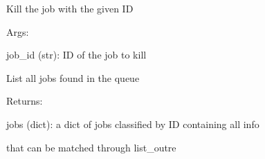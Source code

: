 \documentclass[letterpaper,10pt,english]{sphinxmanual}
\begin{document}
\begin{fulllineitems}
\begin{fulllineitems}
\label{doctree/soprano.hpc.submitter.queues:soprano.hpc.submitter.queues.QueueInterface.PBS}
\end{fulllineitems}


\begin{fulllineitems}
\label{doctree/soprano.hpc.submitter.queues:soprano.hpc.submitter.queues.QueueInterface.kill}
Kill the job with the given ID

\begin{DUlineblock}{0em}
\item[] Args:
\item[]
\begin{DUlineblock}{\DUlineblockindent}
\item[] job\_id (str): ID of the job to kill
\item[] 
\end{DUlineblock}
\end{DUlineblock}

\end{fulllineitems}


\begin{fulllineitems}
\label{doctree/soprano.hpc.submitter.queues:soprano.hpc.submitter.queues.QueueInterface.list}
List all jobs found in the queue

\begin{DUlineblock}{0em}
\item[] Returns:
\item[]
\begin{DUlineblock}{\DUlineblockindent}
\item[] jobs (dict): a dict of jobs classified by ID containing all info
\item[]
\begin{DUlineblock}{\DUlineblockindent}
\item[] that can be matched through list\_outre
\item[] 
\end{DUlineblock}
\end{DUlineblock}
\end{DUlineblock}


\end{fulllineitems}
\end{fulllineitems}
\end{document}
